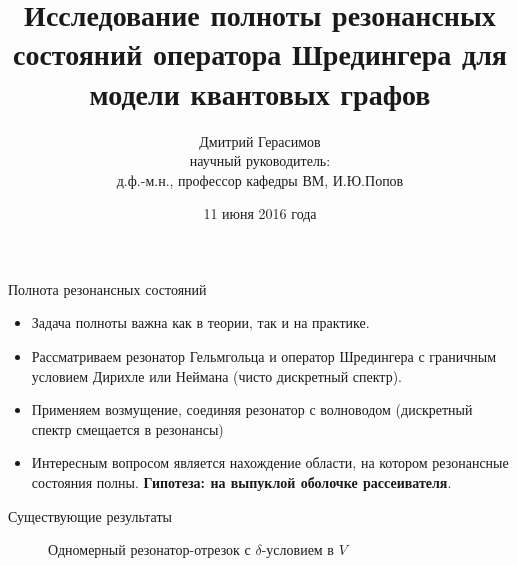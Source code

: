 \documentclass{beamer}
\title[]{Исследование полноты резонансных состояний оператора Шредингера
для модели квантовых графов}
\author[Дмитрий Герасимов]{Дмитрий Герасимов\\{\small научный руководитель: \\ д.ф.-м.н., профессор кафедры ВМ, И.Ю.Попов}}
\institute[ИТМО]{Университет ИТМО}
\date{11 июня 2016 года}
\begin{document}
\maketitle

\begin{frame}{Полнота резонансных состояний}

\begin{itemize}
\item Задача полноты важна как в теории, так и на практике.

\item Рассматриваем резонатор Гельмгольца и оператор Шредингера с граничным условием Дирихле или Неймана (чисто дискретный спектр).

\item Применяем возмущение, соединяя резонатор с волноводом (дискретный спектр смещается в резонансы)

\item Интересным вопросом является нахождение области, на котором резонансные состояния полны. \textbf{Гипотеза: на выпуклой оболочке рассеивателя}.
\end{itemize}
% 
\end{frame}



\begin{frame}{Существующие результаты}
\begin{figure}
\begin{tikzpicture}[scale=0.8]

\end{tikzpicture}
\caption{Одномерный резонатор-отрезок с $\delta$-условием в $V$}
\end{figure}
\end{frame}
\end{document}
